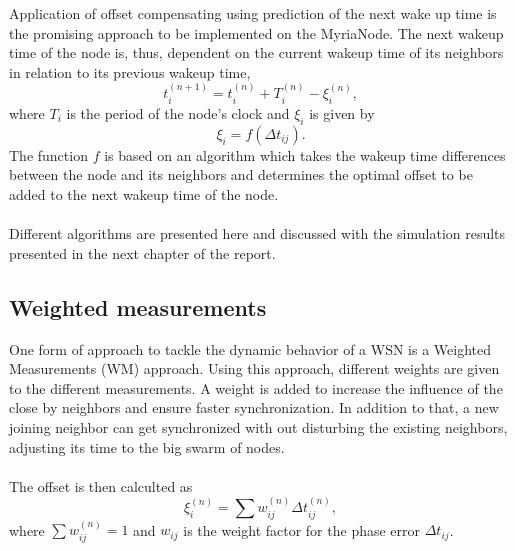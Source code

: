 \documentclass[a4paper,10pt]{report}
\begin{document}
Application of offset compensating using prediction of the next wake up time is the promising approach to be implemented on the MyriaNode. The next wakeup time of the node is, thus, dependent on the current wakeup time of its neighbors in relation to its previous wakeup time,
\begin{equation}
t_i^{(n+1)} = t_i^{(n)} + T_i^{(n)} - \xi_i^{(n)} ,
\end{equation}
where $T_i$ is the period of the node's clock and $\xi_i$ is given by
\begin{equation}
\xi_i = f(\Delta t_{ij}).
\end{equation}
The function $f$ is based on an algorithm which takes the wakeup time differences between the node and its neighbors and determines
the optimal offset to be added to the next wakeup time of the node.
\paragraph*{} Different algorithms are presented here and discussed with the simulation results presented in the next chapter of the report.
\subsection{\textbf{Weighted measurements}}
One form of approach to tackle the dynamic behavior of a WSN is a Weighted Measurements (WM) approach. Using this approach, different weights are given to the different measurements. A weight is added to increase the influence of the close by neighbors and ensure faster synchronization. In addition to that, a new joining neighbor can get synchronized with out disturbing the existing neighbors, adjusting its time to the big swarm of nodes. \paragraph*{}
The offset is then calculted as 
\begin{equation}
\xi_i^{(n)} = \sum{w_{ij}^{(n)}\Delta t_{ij}^{(n)}} ,
\end{equation}
where $\sum{w_{ij}^{(n)}= 1}$ and $w_{ij}$ is the weight factor for the phase error $\Delta t_{ij}$.
\end{document}
